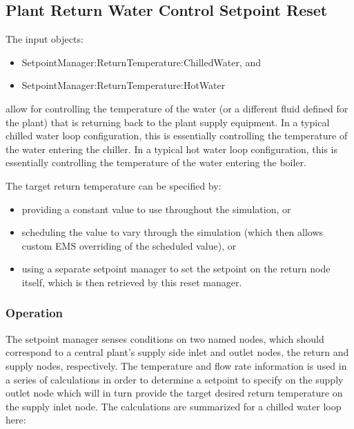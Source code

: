 \subsection{Plant Return Water Control Setpoint Reset}\label{plant-return-water-control-setpoint-reset}

The input objects:

\begin{itemize}
\item
  SetpointManager:ReturnTemperature:ChilledWater, and
\item
  SetpointManager:ReturnTemperature:HotWater
\end{itemize}

allow for controlling the temperature of the water (or a different fluid defined for the plant) that is returning back to the plant supply equipment. In a typical chilled water loop configuration, this is essentially controlling the temperature of the water entering the chiller. In a typical hot water loop configuration, this is essentially controlling the temperature of the water entering the boiler.

The target return temperature can be specified by:

\begin{itemize}
\item
  providing a constant value to use throughout the simulation, or
\item
  scheduling the value to vary through the simulation (which then allows custom EMS overriding of the scheduled value), or
\item
  using a separate setpoint manager to set the setpoint on the return node itself, which is then retrieved by this reset manager.
\end{itemize}

\subsubsection{Operation}\label{operation}

The setpoint manager senses conditions on two named nodes, which should correspond to a central plant's supply side inlet and outlet nodes, the return and supply nodes, respectively. The temperature and flow rate information is used in a series of calculations in order to determine a setpoint to specify on the supply outlet node which will in turn provide the target desired return temperature on the supply inlet node. The calculations are summarized for a chilled water loop here:

